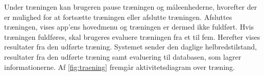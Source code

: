 Under træningen kan brugeren pause træningen og måleenhederne, hvorefter der er mulighed for at fortsætte træningen eller afslutte træningen. Afsluttes træningen, vises app'ens hovedmenu og træningen er dermed ikke fuldført. 
Hvis træningen fuldføres, skal brugeres evaluere træningen fra et til fem. Herefter vises resultater fra den udførte træning. Systemet sender den daglige helbredstilstand, resultater fra den udførte træning samt evaluering til databasen, som lagrer informationerne. 
Af \autoref{fig:traening} fremgår aktivitetsdiagram over træning.